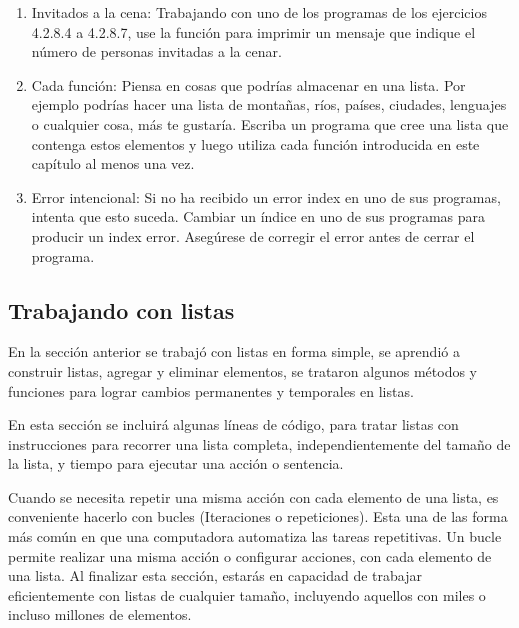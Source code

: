 \begin{enumerate}[4.2.8.9]
	
	\item Invitados a la cena: Trabajando con uno de los programas de los ejercicios  4.2.8.4
	a 4.2.8.7, use la función {} para imprimir un mensaje que indique el número
	de personas invitadas a la cenar.
	
	
	\item [4.2.8.10]Cada función: Piensa en cosas que podrías almacenar en una lista. Por ejemplo podrías hacer una lista de montañas, ríos, países, ciudades, lenguajes o cualquier cosa, más te gustaría. Escriba un programa que cree una lista que contenga estos elementos y
	luego utiliza cada función introducida en este capítulo al menos una vez.
	
	\item[4.2.8.11] Error intencional: Si no ha recibido un error index  en uno de sus programas, intenta que esto suceda.
	Cambiar un índice en uno de sus programas para producir un index error. Asegúrese de corregir el error antes de cerrar el
	programa.
	
\end{enumerate}




\subsection{Trabajando con listas}

En la sección anterior se trabajó con listas en forma simple, se aprendió a construir listas,  agregar y eliminar elementos, se trataron algunos métodos y funciones para lograr cambios permanentes y temporales  en  listas.  

En esta sección se incluirá algunas líneas de código, para tratar listas con instrucciones para recorrer una lista completa,  independientemente del  tamaño de la lista, y tiempo para ejecutar una acción o sentencia. 

Cuando se necesita repetir una misma acción con cada elemento de una lista, es conveniente hacerlo con bucles (Iteraciones o repeticiones).  Esta una de las forma más común en que una computadora automatiza las tareas repetitivas.
Un bucle permite realizar una misma acción o configurar acciones, con cada elemento de una lista. 
Al finalizar esta sección,  estarás en capacidad  de trabajar eficientemente con listas de cualquier tamaño, incluyendo aquellos con miles o incluso millones de elementos.


